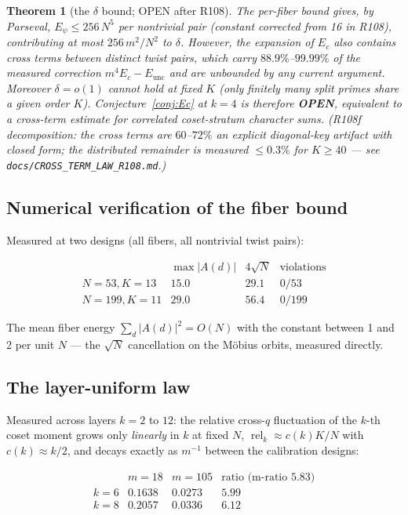 \documentclass[11pt,reqno]{amsart}
\newtheorem{theorem}{Theorem}[section]
\theoremstyle{definition}
\begin{document}
\begin{theorem}[the $\delta$ bound; OPEN after R108]
\label{thm:deltabound}
The per-fiber bound gives, by Parseval, $E_{\psi} \le 256\,N^5$ per
nontrivial pair (constant corrected from 16 in R108), contributing at
most $256\,m^2/N^2$ to $\delta$.  However, the expansion of
$E_c$ also contains cross terms between distinct twist pairs, which
carry $88.9\%$--$99.99\%$ of the measured correction
$m^4 E_c - E_{\mathrm{unc}}$ and are unbounded by any current argument.
Moreover $\delta = o(1)$ cannot hold at fixed $K$ (only finitely many
split primes share a given order $K$).  Conjecture~\ref{conj:Ec} at
$k{=}4$ is therefore \textbf{OPEN}, equivalent to a cross-term estimate
for correlated coset-stratum character sums.  (R108f decomposition: the
cross terms are $60$--$72\%$ an explicit diagonal-key artifact with
closed form; the distributed remainder is measured $\le 0.3\%$ for
$K \ge 40$ — see \texttt{docs/CROSS\_TERM\_LAW\_R108.md}.)
\end{theorem}

\subsection{Numerical verification of the fiber bound}

Measured at two designs (all fibers, all nontrivial twist pairs):

\[
\begin{array}{lccc}
 & \max |A(d)| & 4\sqrt{N} & \text{violations}\\
N = 53, K = 13 & 15.0 & 29.1 & 0/53\\
N = 199, K = 11 & 29.0 & 56.4 & 0/199
\end{array}
\]

The mean fiber energy $\sum_d |A(d)|^2 = O(N)$ with the constant
between 1 and 2 per unit $N$ --- the $\sqrt{N}$ cancellation on the
M\"obius orbits, measured directly.

\subsection{The layer-uniform law}

Measured across layers $k = 2$ to $12$: the relative cross-$q$
fluctuation of the $k$-th coset moment grows only \emph{linearly} in
$k$ at fixed $N$, $\operatorname{rel}_k \approx c(k) K/N$ with
$c(k) \approx k/2$, and decays exactly as $m^{-1}$ between the
calibration designs:

\[
\begin{array}{lccc}
 & m = 18 & m = 105 & \text{ratio (m-ratio } 5.83)\\
k = 6 & 0.1638 & 0.0273 & 5.99\\
k = 8 & 0.2057 & 0.0336 & 6.12
\end{array}
\]
\end{document}
